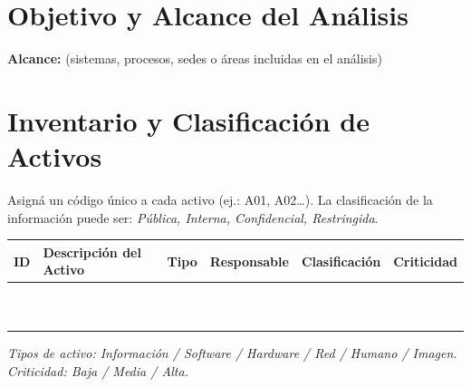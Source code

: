 \documentclass[11pt,a4paper]{article}
\begin{document}
\section{Objetivo y Alcance del Análisis}

\begin{campolibre}[2.5cm]
\end{campolibre}

\textbf{Alcance:} (sistemas, procesos, sedes o áreas incluidas en el análisis)

\begin{campolibre}[2cm]
\end{campolibre}

\section{Inventario y Clasificación de Activos}

Asigná un código único a cada activo (ej.: A01, A02\ldots). La clasificación de la información puede ser: \textit{Pública, Interna, Confidencial, Restringida}.

\begin{center}
\small
\renewcommand{\arraystretch}{1.6}
\begin{tabularx}{\textwidth}{@{} >{\centering\arraybackslash}p{1cm} X >{\raggedright\arraybackslash}p{2.2cm} >{\raggedright\arraybackslash}p{2.3cm} >{\raggedright\arraybackslash}p{2.3cm} >{\centering\arraybackslash}p{1.8cm} @{}}
\toprule
\textbf{ID} & \textbf{Descripción del Activo} & \textbf{Tipo} & \textbf{Responsable} & \textbf{Clasificación} & \textbf{Criticidad} \\
\midrule
 & & & & & \\
 & & & & & \\
 & & & & & \\
 & & & & & \\
 & & & & & \\
 & & & & & \\
 & & & & & \\
 & & & & & \\
 & & & & & \\
 & & & & & \\
\bottomrule
\end{tabularx}
\end{center}

\textit{Tipos de activo: Información / Software / Hardware / Red / Humano / Imagen. Criticidad: Baja / Media / Alta.}
\end{document}
